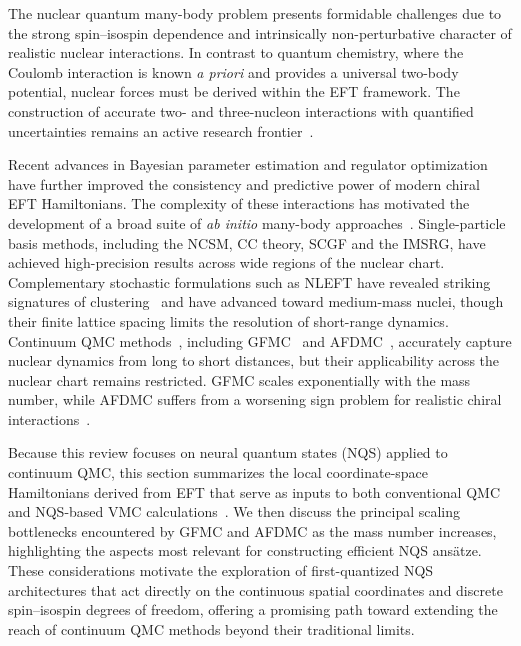 The nuclear quantum many-body problem presents formidable challenges due to the strong spin–isospin dependence and intrinsically non-perturbative character of realistic nuclear interactions. In contrast to quantum chemistry, where the Coulomb interaction is known \emph{a priori} and provides a universal two-body potential, nuclear forces must be derived within the EFT framework. The construction of accurate two- and three-nucleon interactions with quantified uncertainties remains an active research frontier~\cite{epelbaum_modern_2009,machleidt_chiral_2011,ekstrom_what_2023}.

Recent advances in Bayesian parameter estimation and regulator optimization have further improved the consistency and predictive power of modern chiral EFT Hamiltonians.
The complexity of these interactions has motivated the development of a broad suite of \emph{ab initio} many-body approaches~\cite{hergert_guided_2020}. Single-particle basis methods, including the NCSM, CC theory, SCGF and the IMSRG, have achieved high-precision results across wide regions of the nuclear chart. Complementary stochastic formulations such as NLEFT have revealed striking signatures of clustering~\cite{shen_emergent_2023} and have advanced toward medium-mass nuclei, though their finite lattice spacing limits the resolution of short-range dynamics.
Continuum QMC methods~\cite{carlson_quantum_2015,lynn2019,gandolfi2020}, including GFMC~\cite{carlson_alpha_1988} and AFDMC~\cite{Schmidt:1999lik}, accurately capture nuclear dynamics from long to short distances, but their applicability across the nuclear chart remains restricted. GFMC scales exponentially with the mass number, while AFDMC suffers from a worsening sign problem for realistic chiral interactions~\cite{novario_trends_2023,martin_auxiliary_2023}.

Because this review focuses on neural quantum states (NQS) applied to continuum QMC, this section summarizes the local coordinate-space Hamiltonians derived from EFT that serve as inputs to both conventional QMC and NQS-based VMC calculations~\cite{gezerlis_local_2014}. We then discuss the principal scaling bottlenecks encountered by GFMC and AFDMC as the mass number increases, highlighting the aspects most relevant for constructing efficient NQS ans\"{a}tze. These considerations motivate the exploration of first-quantized NQS architectures that act directly on the continuous spatial coordinates and discrete spin–isospin degrees of freedom, offering a promising path toward extending the reach of continuum QMC methods beyond their traditional limits.


